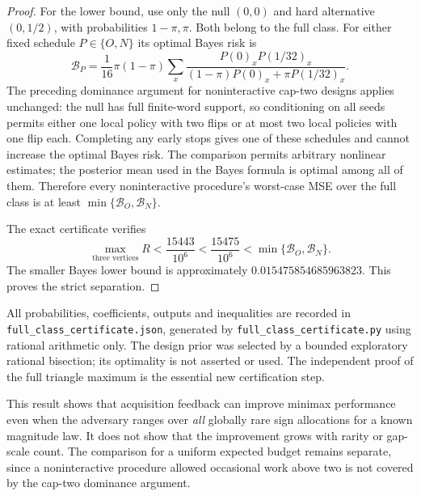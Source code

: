\begin{proof}
For the lower bound, use only the null $(0,0)$ and hard alternative
$(0,1/2)$, with probabilities $1-\pi,\pi$. Both belong to the full class.
For either fixed schedule $P\in\{O,N\}$ its optimal Bayes risk is
\[
 \mathcal B_P=\frac1{16}\pi(1-\pi)\sum_x
 \frac{P(0)_xP(1/32)_x}{(1-\pi)P(0)_x+\pi P(1/32)_x}.
\]
The preceding dominance argument for noninteractive cap-two designs
applies unchanged: the null has full finite-word support, so conditioning
on all seeds permits either one local policy with two flips or at most two
local policies with one flip each. Completing any early stops gives one
of these schedules and cannot increase the optimal Bayes risk. The
comparison permits arbitrary nonlinear estimates; the posterior mean used
in the Bayes formula is optimal among all of them. Therefore every
noninteractive procedure's worst-case MSE over the full class is at least
$\min\{\mathcal B_O,\mathcal B_N\}$.

The exact certificate verifies
\[
 \max_{\text{three vertices}} R
 <\frac{15443}{10^6}<\frac{15475}{10^6}
 <\min\{\mathcal B_O,\mathcal B_N\}.
\]
The smaller Bayes lower bound is approximately
$0.015475854685963823$. This proves the strict separation.
\end{proof}

All probabilities, coefficients, outputs and inequalities are recorded in
\linebreak\texttt{full\_class\_certificate.json}, generated by
\texttt{full\_class\_certificate.py} using rational arithmetic only.
The design prior was selected by a bounded exploratory rational bisection;
its optimality is not asserted or used. The independent proof of the full
triangle maximum is the essential new certification step.

This result shows that acquisition feedback can improve minimax performance
even when the adversary ranges over \emph{all} globally rare sign
allocations for a known magnitude law. It does not show that the improvement
grows with rarity or gap-scale count. The comparison for a uniform expected
budget remains separate, since a noninteractive procedure allowed occasional
work above two is not covered by the cap-two dominance argument.
